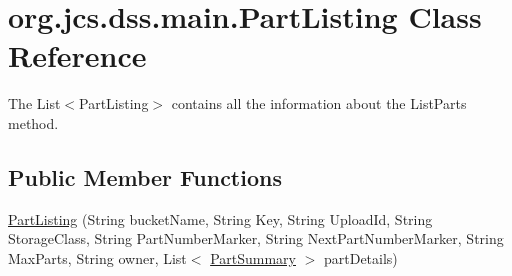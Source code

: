 \hypertarget{classorg_1_1jcs_1_1dss_1_1main_1_1PartListing}{}\section{org.\+jcs.\+dss.\+main.\+Part\+Listing Class Reference}
\label{classorg_1_1jcs_1_1dss_1_1main_1_1PartListing}


The List$<$\+Part\+Listing$>$ contains all the information about the List\+Parts method.  


\subsection*{Public Member Functions}
\begin{DoxyCompactItemize}
\item 
\hyperlink{classorg_1_1jcs_1_1dss_1_1main_1_1PartListing_a289c22870cf4533efc0b891b79e38c88}{Part\+Listing} (String bucket\+Name, String Key, String Upload\+Id, String Storage\+Class, String Part\+Number\+Marker, String Next\+Part\+Number\+Marker, String Max\+Parts, String owner, List$<$ \hyperlink{classorg_1_1jcs_1_1dss_1_1main_1_1PartSummary}{Part\+Summary} $>$ part\+Details)\hypertarget{classorg_1_1jcs_1_1dss_1_1main_1_1PartListing_a289c22870cf4533efc0b891b79e38c88}{}\label{classorg_1_1jcs_1_1dss_1_1main_1_1PartListing_a289c22870cf4533efc0b891b79e38c88}


\end{DoxyCompactItemize}
